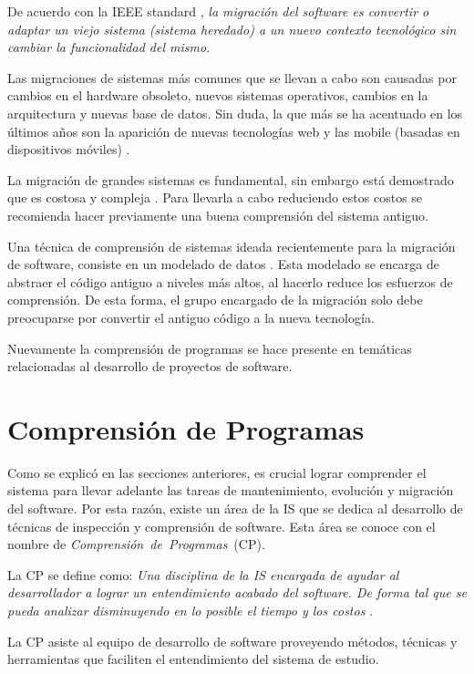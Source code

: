 \documentclass[a4paper,12pt]{report}
\begin{document}
De acuerdo con la IEEE standard \cite{STD1219}, \textit{la migración del software es convertir o adaptar un viejo sistema (sistema heredado) a un nuevo contexto tecnológico sin cambiar la funcionalidad del mismo}.

Las migraciones de sistemas más comunes que se llevan a cabo son causadas por cambios en el hardware obsoleto, nuevos sistemas operativos, cambios en la arquitectura y nuevas base de datos. Sin duda, la que más se ha acentuado en los últimos años son la aparición de nuevas tecnologías web y las mobile (basadas en dispositivos móviles) \cite{MMFAF08}.
 
La migración de grandes sistemas es fundamental, sin embargo está demostrado que es costosa y compleja \cite{MMFAF08}. Para llevarla a cabo reduciendo estos costos se recomienda hacer previamente una buena comprensión del sistema antiguo. 

Una técnica de comprensión de sistemas ideada recientemente para la migración de software, consiste en un mode\-lado de datos \cite{WHAFVR11}. Esta modelado se encarga de abstraer el código antiguo a niveles más altos, al hacerlo reduce los esfuerzos de comprensión. De esta forma, el grupo encargado de la migración solo debe preocuparse por convertir el antiguo código a la nueva tecnología.

Nuevamente la comprensión de programas se hace presente en temáticas relacionadas al desarrollo de proyectos de software.

\section{Comprensión de Programas}

Como se explicó en las secciones anteriores, es crucial lograr comprender el sistema para llevar adelante las tareas de mantenimiento, evolución y migración del software.	
Por esta razón, existe un área de la IS que se dedica al desarrollo de técnicas de inspección y comprensión de software. Esta área se conoce con el nombre de \mbox{\textit{Comprensión de Programas} (CP).}

La CP se define como: \textit{Una disciplina de la IS encargada de ayudar al desarrollador a lograr un entendimiento acabado del software. De forma tal que se pueda analizar disminuyendo en lo posible el tiempo y los costos} \cite{MPMR07}.  

La CP asiste al equipo de desarrollo de software proveyendo métodos, técnicas y herramientas que faciliten el entendimiento del sistema de estudio.
\end{document}

